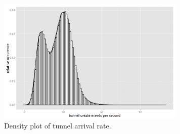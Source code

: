 \documentclass{beamer}
\begin{document}
\begin{frame}
	\begin{figure}
		\centering
			\includegraphics[height=6cm]{extras/R-create-frequency.png}
		\caption{Density plot of tunnel arrival rate.}
	\end{figure}
\end{frame}
\end{document}
